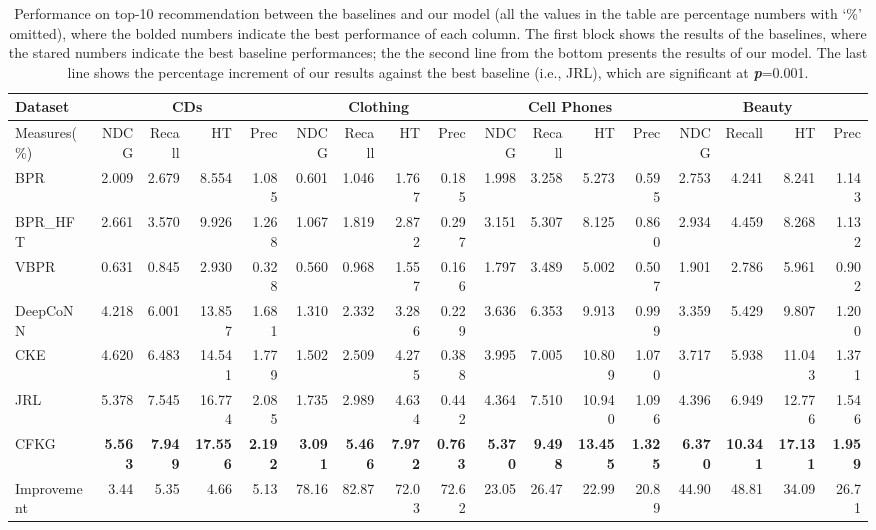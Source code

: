 \documentclass[algorithms,article,accept,moreauthors,pdftex,10pt,a4paper]{Definitions/mdpi}
\begin{document}
\iffalse
\begin{table*}[t]
	\caption{Performance on top-10 recommendation between the baselines and our model (all the values in the table are percentage numbers with `\%' omitted), where the bolded numbers indicate the best performance of each column.
		The first block shows the results of the baselines, where the stared numbers indicate the best baseline performances; 
		the the second line from the bottom presents the results of our model. 
		The last line shows the percentage increment of our results against the best baseline (i.e., JRL), which are significant at \textit{\textbf{p}}=0.001.}
	\centering
	\vspace{-5pt}
	\setlength{\tabcolsep}{2pt}
	\begin{tabular}
		{l|rrrr|rrrr|rrrr|rrrr} \hline\hline
		Dataset &  \multicolumn{4}{c|}{CDs} & \multicolumn{4}{c|}{Clothing} & \multicolumn{4}{c|}{Cell Phones} & \multicolumn{4}{c}{Beauty}\\\hline
		Measures(\%) & NDCG & Recall & HT & Prec & NDCG & Recall & HT & Prec & NDCG & Recall & HT & Prec & NDCG & Recall & HT & Prec \\\hline
		BPR  & 2.009 & 2.679 & 8.554 & 1.085 & 0.601 & 1.046 & 1.767 & 0.185 & 1.998 & 3.258 & 5.273 & 0.595 & 2.753 & 4.241 & 8.241 & 1.143\\
		BPR\_HFT & 2.661 & 3.570 & 9.926 & 1.268 & 1.067 & 1.819 & 2.872 & 0.297 & 3.151 & 5.307 & 8.125 & 0.860 & 2.934  & 4.459 & 8.268 & 1.132\\
		VBPR & 0.631 & 0.845 & 2.930 & 0.328 & 0.560 & 0.968 & 1.557 & 0.166 & 1.797 & 3.489 & 5.002 & 0.507 & 1.901 & 2.786 & 5.961 & 0.902\\
		DeepCoNN  & 4.218 & 6.001 & 13.857 & 1.681 & 1.310 & 2.332 & 3.286 & 0.229 & 3.636 & 6.353 & 9.913 & 0.999 & 3.359 & 5.429 & 9.807 & 1.200\\
		CKE  & 4.620 & 6.483 & 14.541 & 1.779 & 1.502 & 2.509 & 4.275 & 0.388 & 3.995 & 7.005 & 10.809 & 1.070 & 3.717 & 5.938 & 11.043 & 1.371\\
		JRL & {5.378} & {7.545} & {16.774} & {2.085} & {1.735} & {2.989} & {4.634} & {0.442} & {4.364} & {7.510} & {10.940} & {1.096} & {4.396} & {6.949} & {12.776} & {1.546}\\\hline
		CFKG & \textbf{5.563} & \textbf{7.949} & \textbf{17.556} & \textbf{2.192} & \textbf{3.091} & \textbf{5.466} & \textbf{7.972} & \textbf{0.763} & \textbf{5.370} & \textbf{9.498} & \textbf{13.455} & \textbf{1.325} & \textbf{6.370} & \textbf{10.341} & \textbf{17.131} & \textbf{1.959}\\\hline
		Improvement & 3.44 & 5.35  & 4.66 & 5.13 & 78.16 & 82.87 & 72.03 & 72.62 & 23.05 & 26.47 & 22.99 & 20.89 & 44.90 & 48.81 & 34.09 & 26.71\\\hline
	\end{tabular}\label{tab:result}
\end{table*}
\end{document}
